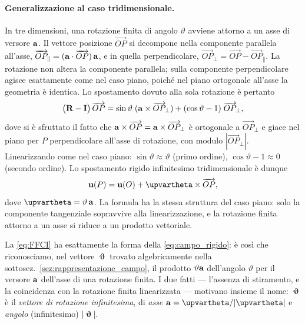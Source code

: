 \paragraph{Generalizzazione al caso tridimensionale.}
In tre dimensioni, una rotazione finita di angolo $\vartheta$ avviene attorno
a un asse di versore $\mathbf{a}$. Il vettore posizione $\overrightarrow{OP}$ si
decompone nella componente parallela all'asse,
$\overrightarrow{OP}_{\!\parallel} = (\mathbf{a} \cdot \overrightarrow{OP})\,\mathbf{a}$,
e in quella perpendicolare,
$\overrightarrow{OP}_{\!\perp} = \overrightarrow{OP} - \overrightarrow{OP}_{\!\parallel}$.
La rotazione non altera la componente parallela; sulla componente perpendicolare
agisce esattamente come nel caso piano, poiché nel piano ortogonale all'asse la
geometria è identica. Lo spostamento dovuto alla sola rotazione è pertanto
\begin{equation}\label{eq:spost_rot_3D}
	\bigl(\mathbf{R} - \mathbf{I}\bigr)\,\overrightarrow{OP}
	= \sin\vartheta\;(\mathbf{a} \times \overrightarrow{OP}_{\!\perp})
	+ (\cos\vartheta - 1)\;\overrightarrow{OP}_{\!\perp},
\end{equation}
dove si è sfruttato il fatto che $\mathbf{a} \times \overrightarrow{OP}= \mathbf{a} \times \overrightarrow{OP}_{\!\perp}$ è ortogonale a $\overrightarrow{OP}_{\!\perp}$ e giace nel piano per $P$ perpendicolare all'asse di rotazione, con modulo
$|\overrightarrow{OP}_{\!\perp}|$.
Linearizzando come nel caso piano: $\sin\vartheta \approx \vartheta$ (primo
ordine), $\cos\vartheta - 1 \approx 0$ (secondo ordine). Lo spostamento rigido
infinitesimo tridimensionale è dunque
\begin{equation}\label{eq:FFCI}
\ub(P) = \ub(O) + \bm{\upvartheta} \times \overrightarrow{OP},
\end{equation}
dove $\bm{\upvartheta} = \vartheta\,\ab$. La formula ha la stessa struttura del caso piano: solo la
componente tangenziale sopravvive alla linearizzazione, e la rotazione finita
attorno a un asse si riduce a un prodotto vettoriale.

La \eqref{eq:FFCI} ha esattamente la forma della \eqref{eq:campo_rigido}: è così che riconosciamo, nel vettore $\bm\upvartheta$ trovato algebricamente nella sottosez.~\ref{sez:rappresentazione_campo}, il prodotto $\vartheta\mathbf{a}$ dell'angolo $\vartheta$ per il versore $\mathbf{a}$ dell'asse di una rotazione finita. I due fatti — l'assenza di stiramento, e la coincidenza con la rotazione finita linearizzata — motivano insieme il nome: $\bm\upvartheta$ è il \textit{vettore di rotazione infinitesima}, di \textit{asse} $\ab=\bm\upvartheta/|\bm\upvartheta|$ e \textit{angolo} (infinitesimo) $|\bm\upvartheta|$.


